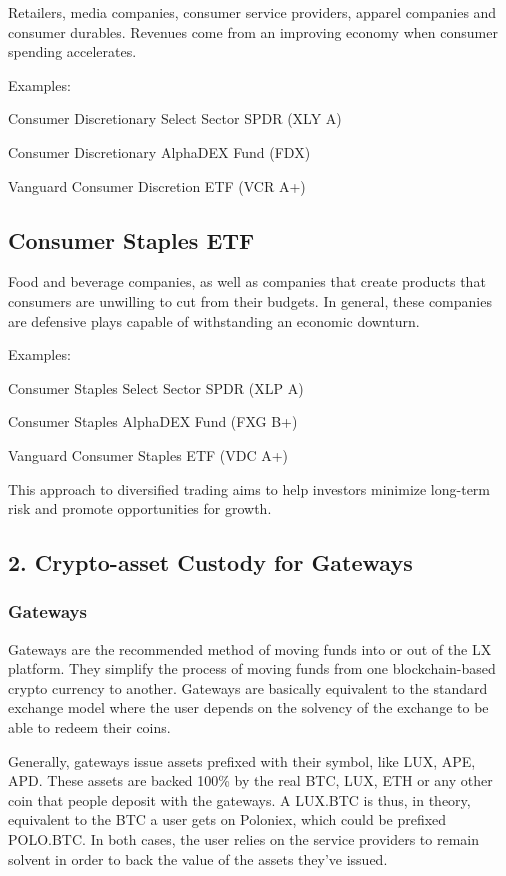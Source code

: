 \documentclass[11pt]{article}
\begin{document}
Retailers, media companies, consumer service providers, apparel companies and consumer durables. Revenues come from an improving economy when consumer spending accelerates.


Examples:


Consumer Discretionary Select Sector SPDR (XLY A)


Consumer Discretionary AlphaDEX Fund (FDX)


Vanguard Consumer Discretion ETF (VCR A+)


\subsection{Consumer Staples ETF}

Food and beverage companies, as well as companies that create products that consumers are unwilling to cut from their budgets. In general, these companies are defensive plays capable of withstanding an economic downturn.


Examples:


Consumer Staples Select Sector SPDR (XLP A)


Consumer Staples AlphaDEX Fund (FXG B+)


Vanguard Consumer Staples ETF (VDC A+)


This approach to diversified trading aims to help investors minimize long-term risk and promote opportunities for growth.


\subsection{2. Crypto-asset Custody for Gateways}

\subsubsection{Gateways}

Gateways are the recommended method of moving funds into or out of the LX platform. They simplify the process of moving funds from one blockchain-based crypto currency to another. Gateways are basically equivalent to the standard exchange model where the user depends on the solvency of the exchange to be able to redeem their coins.


Generally, gateways issue assets prefixed with their symbol, like LUX, APE, APD. These assets are backed 100\% by the real BTC, LUX, ETH or any other coin that people deposit with the gateways. A LUX.BTC is thus, in theory, equivalent to the BTC a user gets on Poloniex, which could be prefixed POLO.BTC. In both cases, the user relies on the service providers to remain solvent in order to back the value of the assets they've issued.
\end{document}
